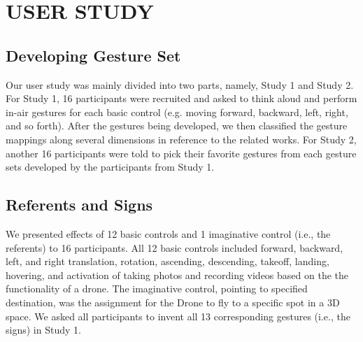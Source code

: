 \documentclass{sigchi}
\begin{document}


\section{USER STUDY}

\subsection{Developing Gesture Set}

Our user study was mainly divided into two parts, namely, Study 1 and Study 2. For Study 1, 16 participants were recruited and asked to think aloud and perform in-air gestures for each basic control (e.g. moving forward, backward, left, right, and so forth). After the gestures being developed, we then classified the gesture mappings along several dimensions in reference to the related works. For Study 2, another 16 participants were told to pick their favorite gestures from each gesture sets developed by the participants from Study 1.


\subsection{Referents and Signs}

We presented effects of 12 basic controls and 1 imaginative control (i.e., the referents) to 16 participants. All 12 basic controls included forward, backward, left, and right translation, rotation, ascending, descending, takeoff, landing, hovering, and activation of taking photos and recording videos based on the the functionality of a drone. The imaginative control, pointing to specified destination, was the assignment for the Drone to fly to a specific spot in a 3D space. We asked all participants to invent all 13 corresponding gestures (i.e., the signs) in Study 1.
\end{document}
